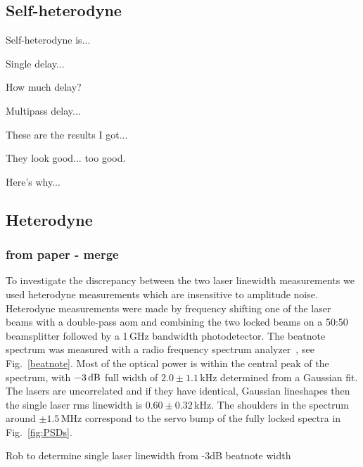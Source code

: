 \subsection{Self-heterodyne}

Self-heterodyne is...

Single delay...

How much delay?

Multipass delay...

These are the results I got...

They look good... too good.

Here's why...\cite{richter_linewidth_1986}

\subsection{Heterodyne}
\subsubsection{from paper - merge}
To investigate the discrepancy between the two laser linewidth measurements we used heterodyne measurements which are insensitive to amplitude noise.
Heterodyne measurements were made by frequency shifting one of the laser beams with a double-pass \gls*{aom} and combining the two locked beams on a 50:50 beamsplitter followed by a 1\,GHz bandwidth photodetector. The beatnote spectrum was measured with a radio frequency spectrum analyzer~\cite{equipment}, see Fig.~\ref{beatnote}. Most of the optical power is within the central peak of the spectrum, with $-3\rm\,dB$ full width of $2.0\pm1.1$\,kHz determined from a Gaussian fit. The lasers are uncorrelated and if they have identical, Gaussian lineshapes then the single laser \gls*{rms} linewidth is $0.60\pm0.32$\,kHz. The shoulders in the spectrum around $\pm1.5$\,MHz correspond to the servo bump of the fully locked spectra in Fig.~\ref{fig:PSDs}.

{\color{red} Rob to determine single laser linewidth from -3dB beatnote width}


